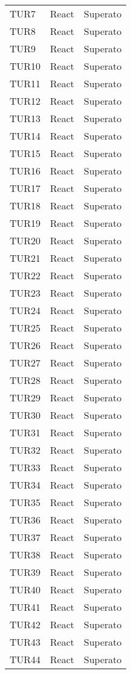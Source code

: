 \documentclass[PianoDiQualifica.tex]{subfiles}
\begin{document}
\begin{longtable}[H]{P{2cm}P{8.5cm}P{3cm}}
	TUR7 & React & Superato \\ 
	TUR8 & React & Superato \\ 
	TUR9 & React & Superato \\ 
	TUR10 & React & Superato \\ 
	TUR11 & React & Superato \\ 
	TUR12 & React & Superato \\ 
	TUR13 & React & Superato \\ 
	TUR14 & React & Superato \\ 
	TUR15 & React & Superato \\ 
	TUR16 & React & Superato \\ 
	TUR17 & React & Superato \\ 
	TUR18 & React & Superato \\ 
	TUR19 & React & Superato \\ 
	TUR20 & React & Superato \\ 
	TUR21 & React & Superato \\ 
	TUR22 & React & Superato \\ 
	TUR23 & React & Superato \\ 
	TUR24 & React & Superato \\ 
	TUR25 & React & Superato \\ 
	TUR26 & React & Superato \\ 
	TUR27 & React & Superato \\ 
	TUR28 & React & Superato \\ 
	TUR29 & React & Superato \\ 
	TUR30 & React & Superato \\ 
	TUR31 & React & Superato \\ 
	TUR32 & React & Superato \\ 
	TUR33 & React & Superato \\ 
	TUR34 & React & Superato \\ 
	TUR35 & React & Superato \\ 
	TUR36 & React & Superato \\ 
	TUR37 & React & Superato \\ 
	TUR38 & React & Superato \\ 
	TUR39 & React & Superato \\ 
	TUR40 & React & Superato \\ 
	TUR41 & React & Superato \\ 
	TUR42 & React & Superato \\ 
	TUR43 & React & Superato \\ 
	TUR44 & React & Superato \\ 

\end{longtable}
\end{document}
